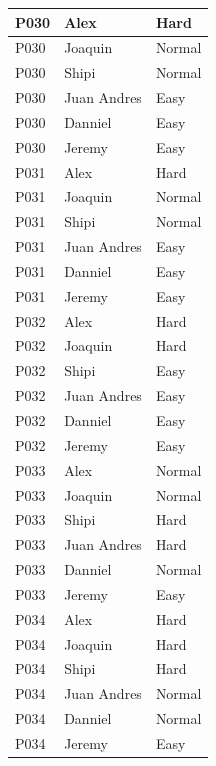 \begin{longtable}{
    |
    >{\centering\arraybackslash}p{4.5cm}|
    >{\centering\arraybackslash}p{4.5cm}|
    >{\centering\arraybackslash}p{4.5cm}|
}
    P030 & Alex        & Hard \\ \hline
    P030 & Joaquin     & Normal \\ \hline
    P030 & Shipi       & Normal \\ \hline
    P030 & Juan Andres & Easy \\ \hline
    P030 & Danniel     & Easy \\ \hline
    P030 & Jeremy      & Easy \\ \hline

    P031 & Alex        & Hard \\ \hline
    P031 & Joaquin     & Normal \\ \hline
    P031 & Shipi       & Normal \\ \hline
    P031 & Juan Andres & Easy \\ \hline
    P031 & Danniel     & Easy \\ \hline
    P031 & Jeremy      & Easy \\ \hline

    P032 & Alex        & Hard \\ \hline
    P032 & Joaquin     & Hard \\ \hline
    P032 & Shipi       & Easy \\ \hline
    P032 & Juan Andres & Easy \\ \hline
    P032 & Danniel     & Easy \\ \hline
    P032 & Jeremy      & Easy \\ \hline

    P033 & Alex        & Normal \\ \hline
    P033 & Joaquin     & Normal \\ \hline
    P033 & Shipi       & Hard \\ \hline
    P033 & Juan Andres & Hard \\ \hline
    P033 & Danniel     & Normal \\ \hline
    P033 & Jeremy      & Easy \\ \hline

    P034 & Alex        & Hard \\ \hline
    P034 & Joaquin     & Hard \\ \hline
    P034 & Shipi       & Hard \\ \hline
    P034 & Juan Andres & Normal \\ \hline
    P034 & Danniel     & Normal \\ \hline
    P034 & Jeremy      & Easy \\ \hline


\end{longtable}
